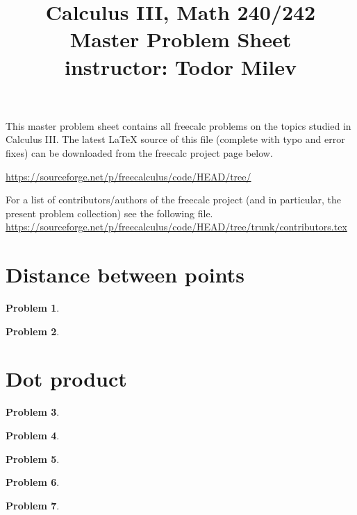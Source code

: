 \documentclass{article}
\title{Calculus III, Math 240/242\\ Master Problem Sheet \\ instructor: Todor Milev}
\newtheorem{problem}{Problem}
\begin{document}
\maketitle

This master problem sheet contains all freecalc problems on the topics studied in Calculus III. The latest \LaTeX{} source of this file (complete with typo and error fixes) can be downloaded from the freecalc project page below. 

\url{https://sourceforge.net/p/freecalculus/code/HEAD/tree/}

For a list of contributors/authors of the freecalc project (and in particular, the present problem collection) see the following file.
\url{https://sourceforge.net/p/freecalculus/code/HEAD/tree/trunk/contributors.tex}


\section{Distance between points}
\begin{problem}

\end{problem}

\begin{problem}

\end{problem}

\section{Dot product}

\begin{problem}

\end{problem}

\begin{problem}

\end{problem}

\begin{problem}

\end{problem}

\begin{problem}

\end{problem}

\begin{problem}

\end{problem}
\end{document}
